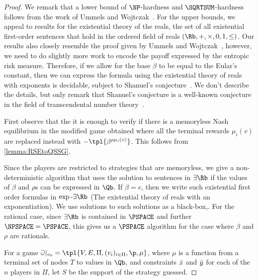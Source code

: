 \begin{proof}
     We remark that a lower bound of $\NP$-hardness and $\SQRTSUM$-hardness  follows from the work of Ummels and Wojtczak~\cite[Theorem 4.4,Theorem 4.6]{UW11}. %
         For the upper bounds, we appeal to results for the existential theory of the reals, the set of all existential first-order sentences that hold in the ordered field of reals $(\Rb,+,\times,0,1,\leq)$. Our results also closely resemble the proof given by Ummels and Wojtczak~\cite[Theorem 4.5]{UW11}, however, we need to do slightly more work to encode the payoff expressed by the entropic risk measure.
         Therefore, if we allow for the base $\beta$ to be equal to the Eular's constant, then we can express the formula using the existential theory of reals with exponents is decidable, subject to Shanuel's conjecture~\cite{MW95}. We don't describe the details, but only remark that Shanuel's conjecture is a well-known conjecture in the field of transcendental number theory~\cite{Lan66}. 
         

    First observe that the it is enough to verify if there is a memoryless Nash equilibrium in the modified game obtained where all the terminal rewards $\mu_i(v)$ are replaced instead with $-\tpl{\beta^{\rho\mu_i(v)}}$. This follows from \cref{lemma:RSEtoQSSG}. 

    Since the players are restricted to strategies that are memoryless, we give a non-deterministic algorithm that uses the solution to sentences in $\exists\Rb$ if the values of $\beta$ and $\rho$s can be expressed in $\Qb$. If $\beta = e$, then we write such existential first order formulas in $\exp\text{-}\exists\Rb$ (The existential theory of reals with an exponentiation). We use solutions to such solutions as a black-box,. For the rational case, since $\exists\Rb$ is contained in $\PSPACE$ and further $\NPSPACE = \PSPACE$, this gives us a $\PSPACE$ algorithm for the case where $\beta$ and $\rho$ are rationals. 
     
     For a game $\Game|_{v_0} = \tpl{V,E,\Pi,(v_i)_{i\in \Pi}, \p,\mu}$, where $\mu$ is a function from a terminal set of nodes $T$ to values in $\Qb$, and constraints $\Bar{x}$ and $\Bar{y}$ for each of the $n$ players in $\Pi$, let $S$ be the support of the strategy guessed. 


\end{proof}
